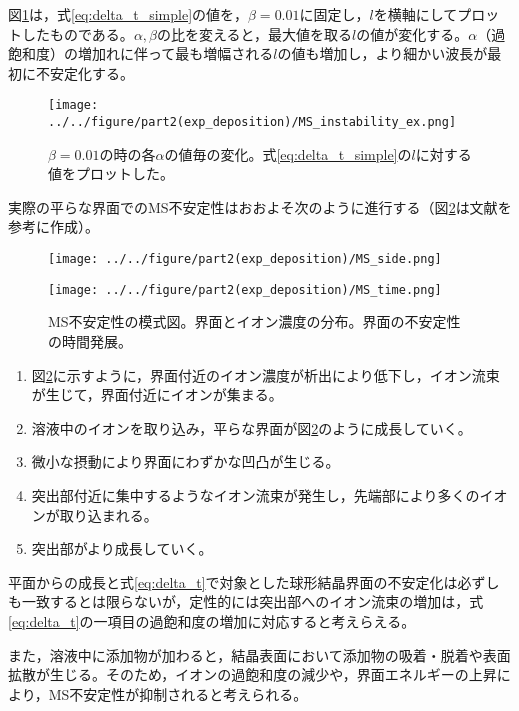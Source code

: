 \documentclass[autodetect-engine,dvi=dvipdfmx,a4paper,ja=standard,oneside,openany,11pt]{bxjsbook}
\begin{document}
図\ref{fig:MS_instability_ex}は，式\eqref{eq:delta_t_simple}の値を，$\beta=0.01$に固定し，$l$を横軸にしてプロットしたものである。$\alpha,\beta$の比を変えると，最大値を取る$l$の値が変化する。$\alpha$（過飽和度）の増加れに伴って最も増幅される$l$の値も増加し，より細かい波長が最初に不安定化する。

\begin{figure}[htbp]
  \centering
  \texttt{[image: ../../figure/part2(exp\_deposition)/MS\_instability\_ex.png]}
  \caption{$\beta=0.01$の時の各$\alpha$の値毎の変化。式\eqref{eq:delta_t_simple}の$l$に対する値をプロットした。}
  \label{fig:MS_instability_ex}
\end{figure}

実際の平らな界面でのMS不安定性はおおよそ次のように進行する（図\ref{fig:MS}は文献\cite{結晶成長}を参考に作成）。

\begin{figure}[htbp]
  \begin{minipage}
    {0.5\textwidth}
    \subcaption{}
    \centering
    \texttt{[image: ../../figure/part2(exp\_deposition)/MS\_side.png]}
    \label{fig:MS_side}
  \end{minipage}
  \begin{minipage}
    {0.5\textwidth}
    \subcaption{}
    \centering
    \texttt{[image: ../../figure/part2(exp\_deposition)/MS\_time.png]}
    \label{fig:MS_top}
  \end{minipage}
  \caption{MS不安定性の模式図。界面とイオン濃度の分布。界面の不安定性の時間発展。}
  \label{fig:MS}
\end{figure}

\begin{enumerate}
  \item 図\ref{fig:MS}に示すように，界面付近のイオン濃度が析出により低下し，イオン流束が生じて，界面付近にイオンが集まる。
  \item 溶液中のイオンを取り込み，平らな界面が図\ref{fig:MS}のように成長していく。
  \item 微小な摂動により界面にわずかな凹凸が生じる。
  \item 突出部付近に集中するようなイオン流束が発生し，先端部により多くのイオンが取り込まれる。
  \item 突出部がより成長していく。
\end{enumerate}
平面からの成長と式\eqref{eq:delta_t}で対象とした球形結晶界面の不安定化は必ずしも一致するとは限らないが，定性的には突出部へのイオン流束の増加は，式\eqref{eq:delta_t}の一項目の過飽和度の増加に対応すると考えらえる。

また，溶液中に添加物が加わると，結晶表面において添加物の吸着・脱着や表面拡散が生じる。そのため，イオンの過飽和度の減少や，界面エネルギーの上昇により，MS不安定性が抑制されると考えられる。

\ifdraft{
  
  
}{}
\end{document}
